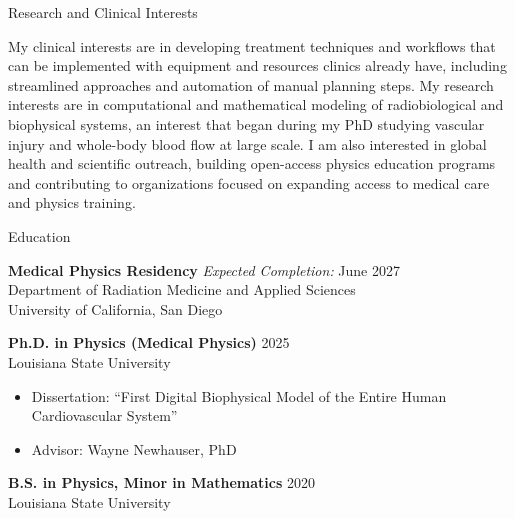 \documentclass[
	11pt, %
]{resume} %
\begin{document}

\begin{rSection}{Research and Clinical Interests}

My clinical interests are in developing treatment techniques and workflows that can be implemented with equipment and resources clinics already have, including streamlined approaches and automation of manual planning steps. My research interests are in computational and mathematical modeling of radiobiological and biophysical systems, an interest that began during my PhD studying vascular injury and whole-body blood flow at large scale. I am also interested in global health and scientific outreach, building open-access physics education programs and contributing to organizations focused on expanding access to medical care and physics training.

\end{rSection}
\vspace{0.6cm}


\begin{rSection}{Education}

	\textbf{Medical Physics Residency} \hfill \textit{Expected Completion:} June 2027 \\
	Department of Radiation Medicine and Applied Sciences \\
	University of California, San Diego

	\textbf{Ph.D. in Physics (Medical Physics)} \hfill 2025 \\
	Louisiana State University
	\vspace{-.2cm}
	\begin{itemize}[label=$\diamond$]
		\itemsep-0.5em
		\item Dissertation: ``First Digital Biophysical Model of the Entire Human Cardiovascular System''
		\item Advisor: Wayne Newhauser, PhD
	\end{itemize}

	\textbf{B.S. in Physics, Minor in Mathematics} \hfill 2020 \\
	Louisiana State University

\end{rSection}
\vspace{0.5cm}
\end{document}
